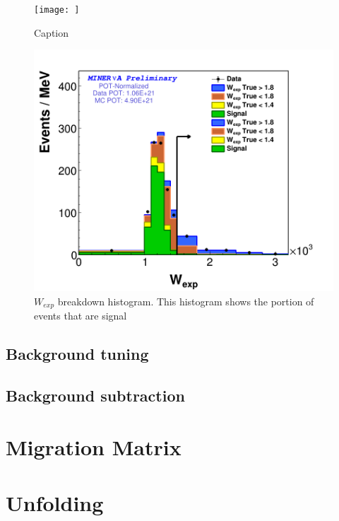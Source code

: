 \begin{figure}
    \centering
    \texttt{[image: ]}
    \caption{Caption}
    \label{fig:enter-label}
\end{figure}

\begin{figure}
    \centering
    \includegraphics{Figures/Chapter4/BGStudies/Breakdown_WSideband_wexp_fit_1Pi_PN_.png}
    \caption{$W_{exp}$ breakdown histogram. This histogram shows the portion of events that are signal }
    \label{fig:enter-label}
\end{figure}

\subsection{Background tuning}

\subsection{Background subtraction}

\section{Migration Matrix}



\section{Unfolding}

